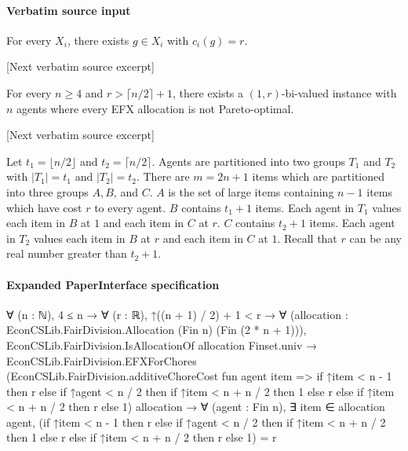 \documentclass[10pt]{article}
\begin{document}
\paragraph{Verbatim source input}
\begin{ReviewVerbatim}
\begin{proposition}\label{prop:PO-exist-large}
    For every $X_i$, there exists $g\in X_i$ with $c_i(g)=r$.
\end{proposition}

[Next verbatim source excerpt]

\begin{theorem}\label{thm:EFXPO}
    For every $n\geq 4$ and $r>\lceil n/2\rceil+1$, there exists a $(1,r)$-bi-valued instance with $n$ agents where every EFX allocation is not Pareto-optimal.
\end{theorem}

[Next verbatim source excerpt]

Let $t_1=\lfloor n/2\rfloor$ and $t_2=\lceil n/2\rceil$.
Agents are partitioned into two groups $T_1$ and $T_2$ with $|T_1|=t_1$ and $|T_2|=t_2$.
There are $m=2n+1$ items which are partitioned into three groups $A,B$, and $C$.
$A$ is the set of large items containing $n-1$ items which have cost $r$ to every agent.
$B$ contains $t_1+1$ items.
Each agent in $T_1$ values each item in $B$ at $1$ and each item in $C$ at $r$.
$C$ contains $t_2+1$ items.
Each agent in $T_2$ values each item in $B$ at $r$ and each item in $C$ at $1$.
Recall that $r$ can be any real number greater than $t_2+1$.
\end{ReviewVerbatim}


\paragraph{Expanded PaperInterface specification}
\begin{ReviewVerbatim}
∀ (n : ℕ),
  4 ≤ n →
    ∀ (r : ℝ),
      ↑((n + 1) / 2) + 1 < r →
        ∀ (allocation : EconCSLib.FairDivision.Allocation (Fin n) (Fin (2 * n + 1))),
          EconCSLib.FairDivision.IsAllocationOf allocation Finset.univ →
            EconCSLib.FairDivision.EFXForChores
                (EconCSLib.FairDivision.additiveChoreCost fun agent item =>
                  if ↑item < n - 1 then r
                  else
                    if ↑agent < n / 2 then if ↑item < n + n / 2 then 1 else r else if ↑item < n + n / 2 then r else 1)
                allocation →
              ∀ (agent : Fin n),
                ∃ item ∈ allocation agent,
                  (if ↑item < n - 1 then r
                    else
                      if ↑agent < n / 2 then if ↑item < n + n / 2 then 1 else r
                      else if ↑item < n + n / 2 then r else 1) =
                    r
\end{ReviewVerbatim}
\end{document}

